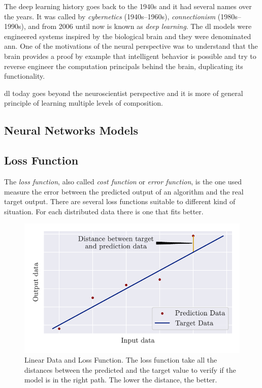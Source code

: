 The deep learning history goes back to the 1940s and it had several names over the years. 
It was called by \emph{cybernetics} (1940s--1960s), \emph{connectionism} (1980s--1990s), and from 2006 until now is known as \emph{deep learning}.
The \gls*{dl} models were engineered systems inspired by the biological brain and they were denominated \gls*{ann}.
One of the motivations of the neural  perspective was to understand that the brain provides a proof by example that intelligent behavior is possible and try to reverse engineer the computation principals behind the brain, duplicating its functionality.

\gls*{dl} today goes beyond the neuroscientist perspective and it is more of general principle of learning multiple levels of composition.

\subsection{Neural Networks Models}

\subsection{Loss Function}

The \emph{loss function}, also called \emph{cost function} or \emph{error function}, is the one used measure the error between the predicted output of an algorithm and the real target output. 
There are several loss functions suitable to different kind of situation. For each distributed data there is one that fits better.

\begin{figure}[!htb]
    \centering
    \includegraphics{figures/3review/nn/mae_chart.pdf}
    \caption[Linear Data and Loss Function]{Linear Data and Loss Function. The loss function take all the distances between the predicted and the target value to verify if the model is in the right path. The lower the distance, the better.}
    \label{fig:mae_chart}
\end{figure}

